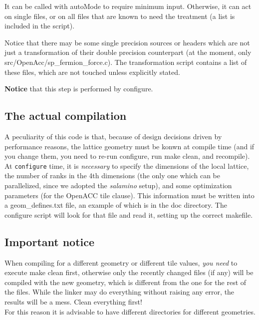 It can be called with {\sf autoMode} to require minimum input. Otherwise, it can act on
single files, or on all files that are known to need the treatment (a list is included in the script).

Notice that there may be some single precision sources or headers which are not just a 
transformation of their double precision counterpart (at the moment, only 
{\sf src/OpenAcc/sp\_fermion\_force.c}). The transformation script contains a list
of these files, which are not touched unless explicitly stated.

{\bf Notice} that this step is performed by {\sf configure}.


\subsection{The actual compilation}

A peculiarity of this code is that, because of design decisions driven by 
performance reasons, the lattice geometry must be konwn at compile time (and 
if you change them, you need to re-run {\sf configure}, run {\sf make clean}, and recompile). 
At \verb|configure| time, it is \emph{necessary} to  specify the dimensions of the local lattice,
the number of ranks in the 4th dimensions (the only one which can be 
parallelized, since we adopted the \emph{salamino} setup), and some optimization parameters
(for the OpenACC  {\sf tile} clause). This information must be written into a 
{\sf geom\_defines.txt} file, an example of which is in the {\sf doc} directory.
The {\sf configure} script will look for that file and read it, setting up the correct makefile.

\subsection{Important notice}

When compiling for a different geometry or different {\sf tile values}, \emph{you need} to execute 
{\sf make clean} first, otherwise only the recently changed files  (if 
any) will be 
compiled with the new geometry, which is different from the one for the rest of 
the files. While the linker may do everything without raising any error, the results will be a 
mess. Clean everything first!\\

For this reason it is advisable to have different directories for different 
geometries.

